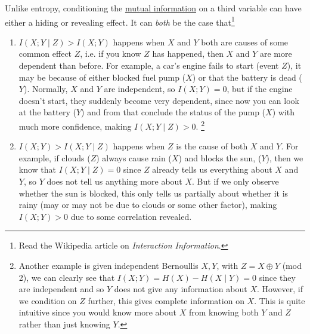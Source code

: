     Unlike entropy, conditioning the \hyperref[def:mutual-information-2]{mutual information} on a third variable can have either a hiding or revealing effect. It can \textit{both} be the case that\footnote{Read the Wikipedia article on \textit{Interaction Information}.}
    \begin{enumerate}
      \item $I(X; Y \mid Z) > I(X; Y)$ happens when $X$ and $Y$ both are causes of some common effect $Z$, i.e. if you know $Z$ has happened, then $X$ and $Y$ are more dependent than before. For example, a car's engine fails to start (event $Z$), it may be because of either blocked fuel pump ($X$) or that the battery is dead ($Y$). Normally, $X$ and $Y$ are independent, so $I(X; Y) = 0$, but if the engine doesn't start, they suddenly become very dependent, since now you can look at the battery ($Y$) and from that conclude the status of the pump ($X$) with much more confidence, making $I(X; Y \mid Z) > 0$. \footnote{Another example is given independent Bernoullis $X, Y$, with $Z = X \oplus Y$ (mod 2), we can clearly see that $I(X; Y) = H(X) - H(X \mid Y) = 0$ since they are independent and so $Y$ does not give any information about $X$. However, if we condition on $Z$ further, this gives complete information on $X$. This is quite intuitive since you would know more about $X$ from knowing both $Y$ and $Z$ rather than just knowing $Y$.}

      \item $I(X; Y) > I(X; Y \mid Z)$ happens when $Z$ is the cause of both $X$ and $Y$. For example, if clouds ($Z$) always cause rain ($X$) and blocks the sun, ($Y$), then we know that $I(X; Y \mid Z) = 0$ since $Z$ already tells us everything about $X$ and $Y$, so $Y$ does not tell us anything more about $X$. But if we only observe whether the sun is blocked, this only tells us partially about whether it is rainy (may or may not be due to clouds or some other factor), making $I(X; Y) > 0$ due to some correlation revealed.   
    \end{enumerate}

